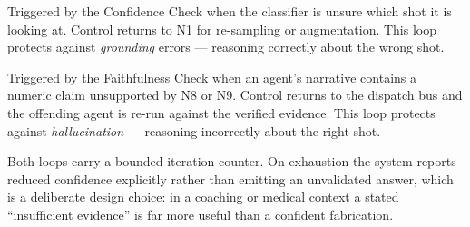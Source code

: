 \documentclass[11pt,a4paper]{article}
\begin{document}
\begin{description}[leftmargin=0em,style=nextline]
\item[The retry loop (perception failure).]
  Triggered by the Confidence Check when the classifier is unsure which shot it
  is looking at. Control returns to N1 for re-sampling or augmentation. This loop
  protects against \emph{grounding} errors --- reasoning correctly about the
  wrong shot.

\item[The regenerate loop (generation failure).]
  Triggered by the Faithfulness Check when an agent's narrative contains a
  numeric claim unsupported by N8 or N9. Control returns to the dispatch bus and
  the offending agent is re-run against the verified evidence. This loop protects
  against \emph{hallucination} --- reasoning incorrectly about the right shot.
\end{description}

Both loops carry a bounded iteration counter. On exhaustion the system reports
reduced confidence explicitly rather than emitting an unvalidated answer, which
is a deliberate design choice: in a coaching or medical context a stated
``insufficient evidence'' is far more useful than a confident fabrication.
\end{document}
